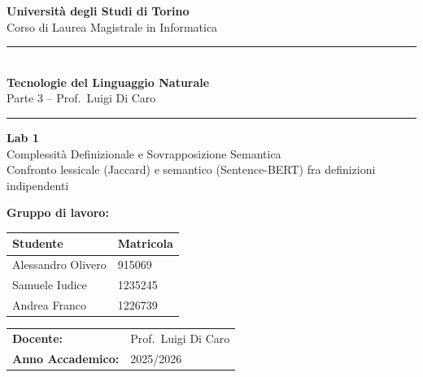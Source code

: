 \documentclass[12pt,a4paper]{article}
\newcommand{\HRule}{\rule{\linewidth}{0.5mm}}
\begin{document}
\raggedbottom

\begin{titlepage}
  \centering
  \vspace*{1.5cm}

  {\Large\textbf{Universit\`a degli Studi di Torino}\\[0.3em]
  Corso di Laurea Magistrale in Informatica}

  \vspace{1cm}
  \HRule\\[0.4em]
  {\LARGE\textbf{Tecnologie del Linguaggio Naturale}}\\[0.3em]
  {\large Parte 3 -- Prof.\ Luigi Di Caro}\\[0.2em]
  \HRule

  \vspace{1.2cm}
  {\huge\textbf{Lab 1}}\\[0.5em]
  {\LARGE Complessit\`a Definizionale e Sovrapposizione Semantica}\\[0.4em]
  {\large Confronto lessicale (Jaccard) e semantico (Sentence-BERT) fra definizioni indipendenti}

  \vspace{2cm}

  {\large\textbf{Gruppo di lavoro:}}\\[0.8em]
  \begin{tabular}{ll}
    \toprule
    \textbf{Studente}    & \textbf{Matricola} \\
    \midrule
    Alessandro Olivero   & 915069  \\
    Samuele Iudice       & 1235245 \\
    Andrea Franco        & 1226739 \\
    \bottomrule
  \end{tabular}

  \vspace{1.5cm}
  \begin{tabular}{ll}
    \textbf{Docente:}          & Prof.\ Luigi Di Caro \\[0.3em]
    \textbf{Anno Accademico:}  & 2025/2026 \\
  \end{tabular}

  \vfill
\end{titlepage}

\tableofcontents
\newpage

\end{document}
